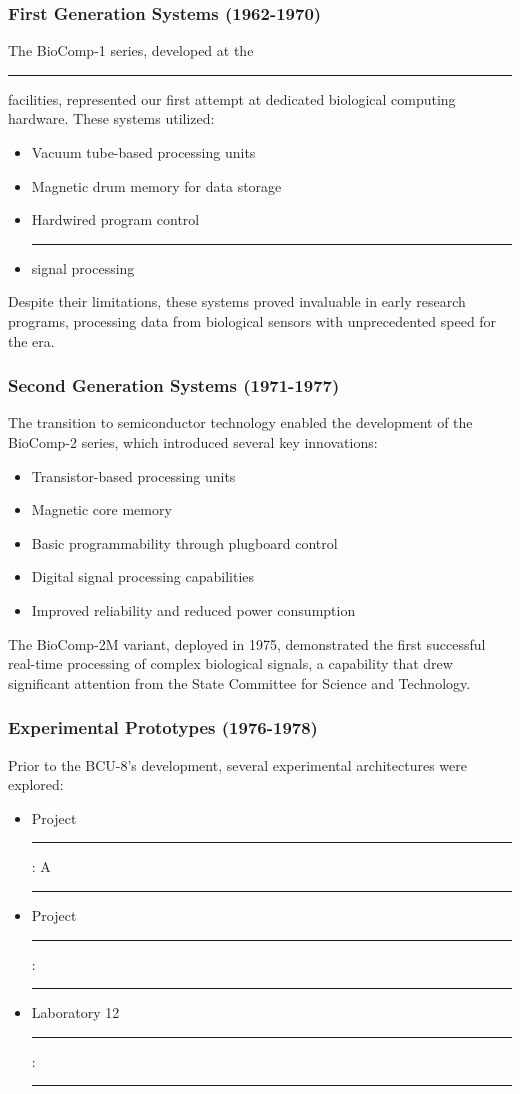 \documentclass[12pt]{article}
\begin{document}
\subsubsection{First Generation Systems (1962-1970)}
The BioComp-1 series, developed at the \rule{35mm}{3.5mm} facilities, represented our first attempt at dedicated biological computing hardware. These systems utilized:
\begin{itemize}
    \item Vacuum tube-based processing units
    \item Magnetic drum memory for data storage
    \item Hardwired program control
    \item \rule{45mm}{3.5mm} signal processing
\end{itemize}

Despite their limitations, these systems proved invaluable in early research programs, processing data from biological sensors with unprecedented speed for the era.

\subsubsection{Second Generation Systems (1971-1977)}
The transition to semiconductor technology enabled the development of the BioComp-2 series, which introduced several key innovations:
\begin{itemize}
    \item Transistor-based processing units
    \item Magnetic core memory
    \item Basic programmability through plugboard control
    \item Digital signal processing capabilities
    \item Improved reliability and reduced power consumption
\end{itemize}

The BioComp-2M variant, deployed in 1975, demonstrated the first successful real-time processing of complex biological signals, a capability that drew significant attention from the State Committee for Science and Technology.

\subsubsection{Experimental Prototypes (1976-1978)}
Prior to the BCU-8's development, several experimental architectures were explored:
\begin{itemize}
    \item Project \rule{35mm}{3.5mm}: A \rule{65mm}{3.5mm}
    \item Project \rule{40mm}{3.5mm}: \rule{70mm}{3.5mm}
    \item Laboratory 12 \rule{45mm}{3.5mm}: \rule{75mm}{3.5mm}
\end{itemize}
\end{document}
